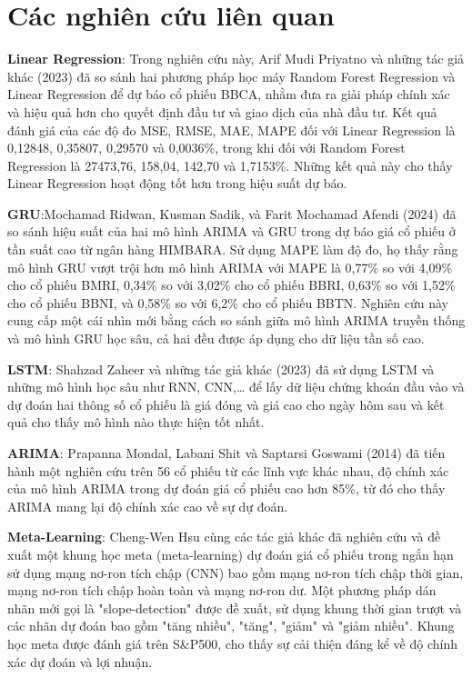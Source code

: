 \section{Các nghiên cứu liên quan}
\textbf{Linear Regression}: Trong nghiên cứu này, Arif Mudi Priyatno và những tác giả khác \cite{b1} (2023) đã so sánh hai phương pháp học máy Random Forest Regression và Linear Regression để dự báo cổ phiếu BBCA, nhằm đưa ra giải pháp chính xác và hiệu quả hơn cho quyết định đầu tư và giao dịch của nhà đầu tư. Kết quả đánh giá của các độ đo MSE, RMSE, MAE, MAPE đối với Linear Regression là 0,12848, 0,35807, 0,29570 và 0,0036\%, trong khi đối với Random Forest Regression là 27473,76, 158,04, 142,70 và 1,7153\%. Những kết quả này cho thấy Linear Regression hoạt động tốt hơn trong hiệu suất dự báo.
\par
\textbf{GRU}:Mochamad Ridwan, Kusman Sadik, và Farit Mochamad Afendi \cite{b2} (2024) đã so sánh hiệu suất của hai mô hình ARIMA và GRU trong dự báo giá cổ phiếu ở tần suất cao từ ngân hàng HIMBARA. Sử dụng MAPE làm độ đo, họ thấy rằng mô hình GRU vượt trội hơn mô hình ARIMA với MAPE là 0,77\% so với 4,09\% cho cổ phiếu BMRI, 0,34\% so với 3,02\% cho cổ phiếu BBRI, 0,63\% so với 1,52\% cho cổ phiếu BBNI, và 0,58\% so với 6,2\% cho cổ phiếu BBTN. Nghiên cứu này cung cấp một cái nhìn mới bằng cách so sánh giữa mô hình ARIMA truyền thống và mô hình GRU học sâu, cả hai đều được áp dụng cho dữ liệu tần số cao.
\par
\textbf{LSTM}: Shahzad Zaheer và những tác giả khác \cite{b3} (2023) đã sử dụng LSTM và những mô hình học sâu như RNN, CNN,… để lấy dữ liệu chứng khoán đầu vào và dự đoán hai thông số cổ phiếu là giá đóng và giá cao cho ngày hôm sau và kết quả cho thấy mô hình nào thực hiện tốt nhất.
\par
\textbf{ARIMA}: Prapanna Mondal, Labani Shit và Saptarsi Goswami \cite{b4} (2014) đã tiến hành một nghiên cứu trên 56 cổ phiếu từ các lĩnh vực khác nhau, độ chính xác của mô hình ARIMA trong dự đoán giá cổ phiếu cao hơn 85\%, từ đó cho thấy ARIMA mang lại độ chính xác cao về sự dự đoán.
\par
\textbf{Meta-Learning}: Cheng-Wen Hsu cùng các tác giả khác \cite{b5} đã nghiên cứu và đề xuất một khung học meta (meta-learning) dự đoán giá cổ phiếu trong ngắn hạn sử dụng mạng nơ-ron tích chập (CNN) bao gồm mạng nơ-ron tích chập thời gian, mạng nơ-ron tích chập hoàn toàn và mạng nơ-ron dư. Một phương pháp dán nhãn mới gọi là "slope-detection" được đề xuất, sử dụng khung thời gian trượt và các nhãn dự đoán bao gồm "tăng nhiều", "tăng", "giảm" và "giảm nhiều". Khung học meta được đánh giá trên S\&P500, cho thấy sự cải thiện đáng kể về độ chính xác dự đoán và lợi nhuận.

